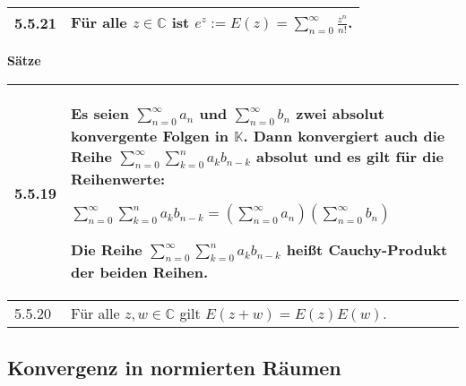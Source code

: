 \begin{longtable}{p{1cm} p{16cm}}
    \toprule

    5.5.21& Für alle $z \in \mathbb{C}$ ist $e^z:= E(z) = \sum\limits^{\infty}_{n=0} \frac{z^n}{n!}$. \\

    \bottomrule

\end{longtable}


\noindent 
\textbf{Sätze}

\begin{longtable}{p{1cm} p{16cm}}
    \toprule

    5.5.19& Es seien $\sum^{\infty}_{n=0} a_n$ und $\sum^{\infty}_{n=0} b_n$ zwei \textbf{absolut konvergente Folgen} in $\mathbb{K}$.
            Dann konvergiert auch die Reihe $\sum^{\infty}_{n=0} \sum^{n}_{k=0} a_k b_{n-k}$ \textbf{absolut} und es gilt für
            die Reihenwerte: \hfill \break
            \centerline{$\sum\limits^{\infty}_{n=0} \sum\limits^{n}_{k=0} a_k b_{n-k} = (\sum\limits^{\infty}_{n=0} a_n) (\sum\limits^{\infty}_{n=0} b_n)$} 
            Die Reihe $\sum\limits^{\infty}_{n=0} \sum\limits^{n}_{k=0} a_k b_{n-k}$ heißt \textbf{Cauchy-Produkt} der beiden Reihen. \\
    \midrule
    5.5.20& Für alle $z,w \in \mathbb{C}$ gilt $E(z+w) = E(z)E(w)$. \\

    \bottomrule
\end{longtable}




\subsection{Konvergenz in normierten Räumen}

